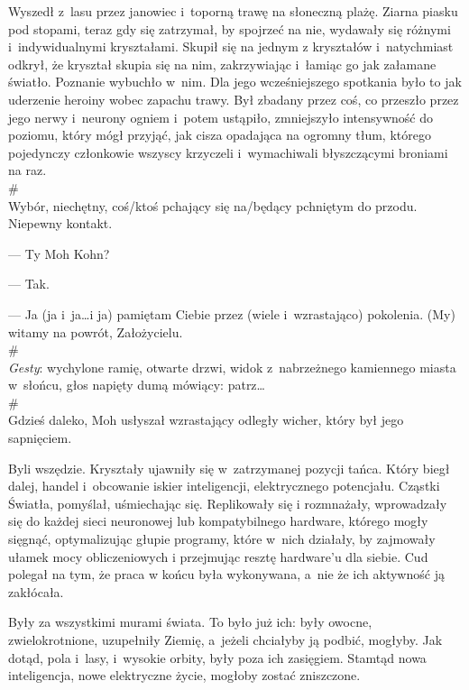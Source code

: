 \documentclass[oneside,polish,11pt,sfheadings]{mwbk}
\begin{document}
Wyszedł z~lasu przez janowiec i~toporną trawę na słoneczną plażę. Ziarna
piasku pod stopami, teraz gdy się zatrzymał, by spojrzeć na nie,
wydawały się różnymi i~indywidualnymi kryształami. Skupił się na jednym
z kryształów i~natychmiast odkrył, że kryształ skupia się na nim,
zakrzywiając i~łamiąc go jak załamane światło. Poznanie wybuchło w~nim.
Dla jego wcześniejszego spotkania było to jak uderzenie heroiny wobec
zapachu trawy. Był zbadany przez coś, co przeszło przez jego nerwy i~neurony ogniem i~potem ustąpiło, zmniejszyło intensywność do poziomu,
który mógł przyjąć, jak cisza opadająca na ogromny tłum, którego
pojedynczy członkowie wszyscy krzyczeli i~wymachiwali błyszczącymi
broniami na raz.\\

\#\\

Wybór, niechętny, coś/ktoś pchający się na/będący pchniętym do przodu.
Niepewny kontakt.

--- Ty Moh Kohn?

--- Tak.

--- Ja (ja i~ja\ldots i ja) pamiętam Ciebie przez (wiele i~wzrastająco)
pokolenia. (My) witamy na powrót, Założycielu.\\

\#\\

\emph{Gesty}: wychylone ramię, otwarte drzwi, widok z~nabrzeżnego
kamiennego miasta w~słońcu, głos napięty dumą mówiący: patrz\ldots\\

\#\\

Gdzieś daleko, Moh usłyszał wzrastający odległy wicher, który był jego
sapnięciem.

Byli wszędzie. Kryształy ujawniły się w~zatrzymanej pozycji tańca. Który
biegł dalej, handel i~obcowanie iskier inteligencji, elektrycznego
potencjału. Cząstki Światła, pomyślał, uśmiechając się. Replikowały się
i rozmnażały, wprowadzały się do każdej sieci neuronowej lub
kompatybilnego hardware, którego mogły sięgnąć, optymalizując głupie
programy, które w~nich działały, by zajmowały ułamek mocy obliczeniowych
i przejmując resztę hardware'u dla siebie. Cud polegał na tym, że praca
w końcu była wykonywana, a~nie że ich aktywność ją zakłócała.

Były za wszystkimi murami świata. To było już ich: były owocne,
zwielokrotnione, uzupełniły Ziemię, a~jeżeli chciałyby ją podbić,
mogłyby. Jak dotąd, pola i~lasy, i~wysokie orbity, były poza ich
zasięgiem. Stamtąd nowa inteligencja, nowe elektryczne życie, mogłoby
zostać zniszczone.
\end{document}
